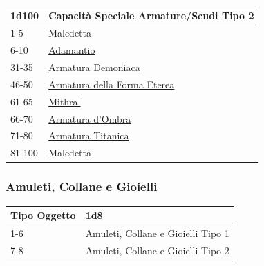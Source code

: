 \begin{multicols}{2}
{{\small\begin{tabularx}{\linewidth}{ll}
		\toprule
\rowcolor{gray!20}\textbf{1d100} & \textbf{Capacità Speciale Armature/Scudi Tipo 2}\\
\toprule
1-5 & Maledetta\\
\rowcolor{gray!20}6-10 &\hyperlink{Adamantio}{Adamantio}\\
31-35& \hyperlink{Armatura Demoniaca}{Armatura Demoniaca}\\
\rowcolor{gray!20}46-50& \hyperlink{Armatura della Forma Eterea}{Armatura della Forma Eterea}\\
61-65 &\hyperlink{Mithral}{Mithral}\\
\rowcolor{gray!20}66-70 &\hyperlink{Armatura d'Ombra}{Armatura d'Ombra}\\
71-80 &\hyperlink{Armatura Titanica}{Armatura Titanica}\\
\rowcolor{gray!20}81-100 & Maledetta\\
\end{tabularx}}

\subsubsection{Amuleti, Collane e Gioielli}\hypertarget{amuleticollanegioielli}{}\label{amuleticollanegioielli}

{\small\begin{tabular}{ll}
		\toprule
\rowcolor{gray!20}\textbf{Tipo Oggetto}&\textbf{1d8}\\
\toprule
1-6&Amuleti, Collane e Gioielli Tipo 1\\
7-8&Amuleti, Collane e Gioielli Tipo 2\\
\end{tabular}}

\medskip\hypertarget{amuleticollanegioielli1}{}

}
\end{multicols}

